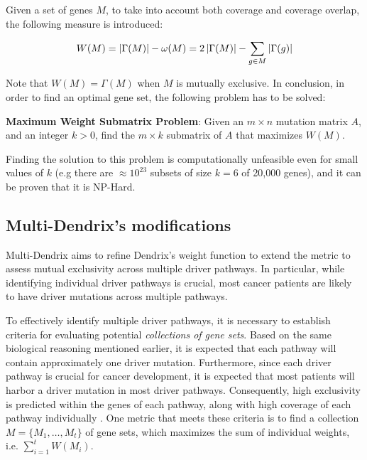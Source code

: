 Given a set of genes $M$, to take into account both coverage and coverage overlap, the following measure is introduced:

\begin{equation}\label{weight}
    W(M) = \left|\Gamma(M)\right| - \omega(M) = 2 \left|\Gamma(M)\right| - \sum_{g \in M} {\left|\Gamma(g)\right|}
\end{equation}

Note that $W(M) = \Gamma(M)$ when $M$ is mutually exclusive. In conclusion, in order to find an optimal gene set, the following problem has to be solved:

\begin{displayquote}
    \textbf{Maximum Weight Submatrix Problem}: Given an $m \times n$ mutation matrix $A$, and an integer $k > 0$, find the $m \times k$ submatrix of $A$ that maximizes $W(M)$.
\end{displayquote}

Finding the solution to this problem is computationally unfeasible even for small values of $k$ (e.g there are $\approx 10^{23}$ subsets of size $k = 6$ of 20,000 genes), and it can be proven that it is NP-Hard. 

\subsection{Multi-Dendrix's modifications}

Multi-Dendrix aims to refine Dendrix's weight function to extend the metric to assess mutual exclusivity across multiple driver pathways. In particular, while identifying individual driver pathways is crucial, most cancer patients are likely to have driver mutations across multiple pathways.

To effectively identify multiple driver pathways, it is necessary to establish criteria for evaluating potential \textit{collections of gene sets}. Based on the same biological reasoning mentioned earlier, it is expected that each pathway will contain approximately one driver mutation. Furthermore, since each driver pathway is crucial for cancer development, it is expected that most patients will harbor a driver mutation in most driver pathways. Consequently, high exclusivity is predicted within the genes of each pathway, along with high coverage of each pathway individually \cite{multi-dendrix}. One metric that meets these criteria is to find a collection $M = \{M_1, \ldots, M_t\}$ of gene sets, which maximizes the sum of individual weights, i.e. $\sum_{i = 1}^t {W(M_i)}$.

